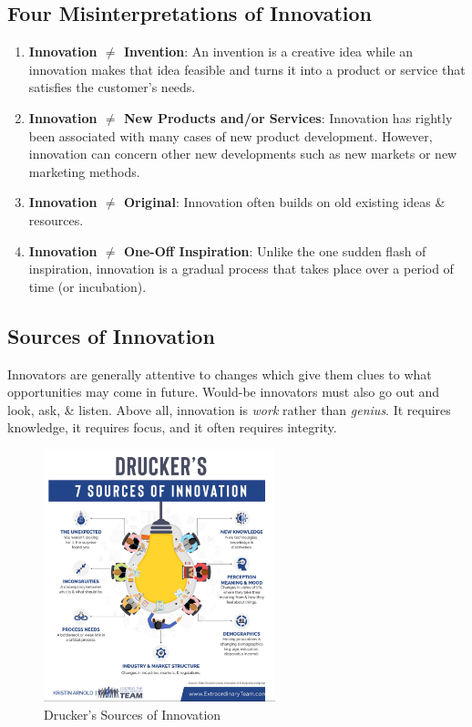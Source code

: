 \documentclass[a4paper,11pt]{article}
\begin{document}
\subsection{Four Misinterpretations of Innovation}
\begin{enumerate}
    \item   \textbf{Innovation $\neq$ Invention}: An invention is a creative idea while an innovation makes that idea 
            feasible and turns it into a product or service that satisfies the customer's needs.

    \item   \textbf{Innovation $\neq$ New Products and/or Services}: Innovation has rightly been associated with many 
            cases of new product development.
            However, innovation can concern other new developments such as new markets or new marketing methods.

    \item   \textbf{Innovation $\neq$ Original}: Innovation often builds on old existing ideas \& resources.
    
    \item   \textbf{Innovation $\neq$ One-Off Inspiration}: Unlike the one sudden flash of inspiration, innovation
            is a gradual process that takes place over a period of time (or incubation).
\end{enumerate}

\subsection{Sources of Innovation}
Innovators are generally attentive to changes which give them clues to what opportunities may come in future.
Would-be innovators must also go out and look, ask, \& listen.
Above all, innovation is \textit{work} rather than \textit{genius}.
It requires knowledge, it requires focus, and it often requires integrity.

\begin{figure}[H]
    \centering
    \includegraphics[width=0.6\textwidth]{images/druckers_sources_of_innovation.png}
    \caption{Drucker's Sources of Innovation}
\end{figure}
\end{document}
